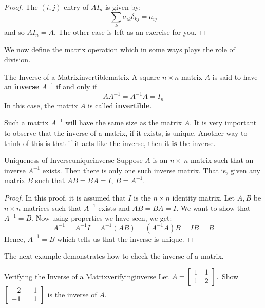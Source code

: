 \ifdefined\showproofs
\begin{proof}
The $(i,j)$-entry of $AI_n$ is given by:
\begin{equation*}
\sum_{k}a_{ik}\delta _{kj}=a_{ij}
\end{equation*}
and so $AI_{n}=A.$ The other case is left as an exercise for you. 
\end{proof}
\fi
We now define the matrix operation which in some ways plays the role of division. 

\begin{definition}{The Inverse of a Matrix}{invertiblematrix}
A square  $n\times n$ matrix $A$ is said to have an \textbf{inverse} $A^{-1}$
if and only if 
\begin{equation*}
AA^{-1}=A^{-1}A=I_n
\end{equation*}
In this case, the matrix $A$ is called
 \textbf{invertible}.
\end{definition}

Such a  matrix $A^{-1}$ will have the same size as the matrix $A$. 
It is very important to observe that the inverse of a matrix, if it exists,
is unique. Another way to think of this is that if it acts like the inverse,
then it $\textbf{is}$ the inverse.

\begin{theorem}{Uniqueness of Inverse}{uniqueinverse}
Suppose $A$ is an $n \times\ n$ matrix such that an inverse  $A^{-1}$ exists. Then there is only one such 
inverse matrix. 
That is, given any matrix $B$ such that $AB=BA=I$, $B=A^{-1}$.
\end{theorem}

\ifdefined\showproofs
\begin{proof} In this proof, it is assumed that $I$ is the $n \times n$ identity matrix. 
Let $A, B$ be $n \times n$ matrices such that $A^{-1}$ exists and $AB=BA=I$. 
We want to show that $A^{-1} = B$. 
Now using properties we have seen, we get: 
\begin{equation*}
A^{-1}=A^{-1}I=A^{-1}\left( AB\right) =\left( A^{-1}A\right) B=IB=B
\end{equation*}
Hence, $A^{-1} = B$ which tells us that the inverse is unique.
\end{proof}
\fi
The next example demonstrates how to check the inverse of a matrix. 

\begin{example}{Verifying the Inverse of a Matrix}{verifyinginverse}
Let $A=\left[
\begin{array}{rr}
1 & 1 \\
1 & 2
\end{array}
\right] .$ Show $\left[
\begin{array}{rr}
2 & -1 \\
-1 & 1
\end{array}
\right] $ is the inverse of $A.$
\end{example}

